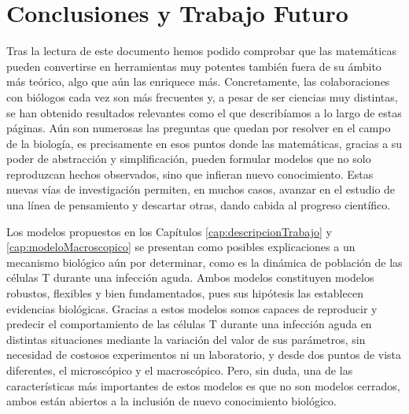 \chapter{Conclusiones y Trabajo Futuro}
\label{cap:conclusiones}



Tras la lectura de este documento hemos podido comprobar que las matemáticas pueden convertirse en herramientas muy potentes también fuera de su ámbito más teórico, algo que aún las enriquece más. Concretamente, las colaboraciones con biólogos cada vez son más frecuentes y, a pesar de ser ciencias muy distintas, se han obtenido resultados relevantes como el que describíamos a lo largo de estas páginas. Aún son numerosas las preguntas que quedan por resolver en el campo de la biología, es precisamente en esos puntos donde las matemáticas, gracias a su poder de abstracción y simplificación, pueden formular modelos que no solo reproduzcan hechos observados, sino que infieran nuevo conocimiento. Estas nuevas vías de investigación permiten, en muchos casos, avanzar en el estudio de una línea de pensamiento y descartar otras, dando cabida al progreso científico.

Los modelos propuestos en los Capítulos \ref{cap:descripcionTrabajo} y \ref{cap:modeloMacroscopico} se presentan como posibles explicaciones a un mecanismo biológico aún por determinar, como es la dinámica de población de las células T durante una infección aguda. Ambos modelos constituyen modelos robustos, flexibles y bien fundamentados, pues sus hipótesis las establecen evidencias biológicas. Gracias a estos modelos somos capaces de reproducir y predecir el comportamiento de las células T durante una infección aguda en distintas situaciones mediante la variación del valor de sus parámetros, sin necesidad de costosos experimentos ni un laboratorio, y desde dos puntos de vista diferentes, el microscópico y el macroscópico. Pero, sin duda, una de las características más importantes de estos modelos es que no son modelos cerrados, ambos están abiertos a la inclusión de nuevo conocimiento biológico. 

